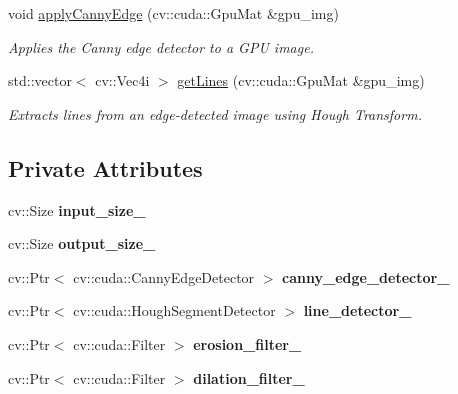 \begin{DoxyCompactItemize}
void \hyperlink{classImageProcessor_a54826c571dfde1f85fec2ad86f21f69a}{apply\+Canny\+Edge} (cv\+::cuda\+::\+Gpu\+Mat \&gpu\+\_\+img)
\begin{DoxyCompactList}\small\item\em Applies the Canny edge detector to a G\+PU image. \end{DoxyCompactList}\item 
std\+::vector$<$ cv\+::\+Vec4i $>$ \hyperlink{classImageProcessor_aaceb6004986b3c9c61084531dbb12011}{get\+Lines} (cv\+::cuda\+::\+Gpu\+Mat \&gpu\+\_\+img)
\begin{DoxyCompactList}\small\item\em Extracts lines from an edge-\/detected image using Hough Transform. \end{DoxyCompactList}\end{DoxyCompactItemize}
\subsection*{Private Attributes}
\begin{DoxyCompactItemize}
\item 
\mbox{\label{classImageProcessor_a964238c103b14e74afab0ebc9671bc88}} 
cv\+::\+Size {\bfseries input\+\_\+size\+\_\+}
\item 
\mbox{\label{classImageProcessor_a8686621bd8c62a575c221ae45f9e70b9}} 
cv\+::\+Size {\bfseries output\+\_\+size\+\_\+}
\item 
\mbox{\label{classImageProcessor_a873e79e99bc7c9f7602fde8d8e47aa76}} 
cv\+::\+Ptr$<$ cv\+::cuda\+::\+Canny\+Edge\+Detector $>$ {\bfseries canny\+\_\+edge\+\_\+detector\+\_\+}
\item 
\mbox{\label{classImageProcessor_a56f6caa5183f0f2000a094fcf2cdf1a5}} 
cv\+::\+Ptr$<$ cv\+::cuda\+::\+Hough\+Segment\+Detector $>$ {\bfseries line\+\_\+detector\+\_\+}
\item 
\mbox{\label{classImageProcessor_a9e2ba2ac27b9c0d5b38e05ccc52d67ca}} 
cv\+::\+Ptr$<$ cv\+::cuda\+::\+Filter $>$ {\bfseries erosion\+\_\+filter\+\_\+}
\item 
\mbox{\label{classImageProcessor_a46acab87bda21888d9cec25857661aff}} 
cv\+::\+Ptr$<$ cv\+::cuda\+::\+Filter $>$ {\bfseries dilation\+\_\+filter\+\_\+}
\end{DoxyCompactItemize}


